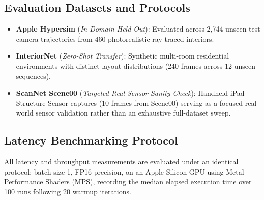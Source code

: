\documentclass[10pt,twocolumn,letterpaper]{article}
\begin{document}
\subsection{Evaluation Datasets and Protocols}
\begin{itemize}
    \item \textbf{Apple Hypersim} \cite{roberts2021hypersim} (\textit{In-Domain Held-Out}): Evaluated across 2,744 unseen test camera trajectories from 460 photorealistic ray-traced interiors.
    \item \textbf{InteriorNet} \cite{li2018interiornet} (\textit{Zero-Shot Transfer}): Synthetic multi-room residential environments with distinct layout distributions (240 frames across 12 unseen sequences).
    \item \textbf{ScanNet Scene00} \cite{dai2017scannet} (\textit{Targeted Real Sensor Sanity Check}): Handheld iPad Structure Sensor captures (10 frames from Scene00) serving as a focused real-world sensor validation rather than an exhaustive full-dataset sweep.
\end{itemize}

\subsection{Latency Benchmarking Protocol}
All latency and throughput measurements are evaluated under an identical protocol: batch size 1, FP16 precision, on an Apple Silicon GPU using Metal Performance Shaders (MPS), recording the median elapsed execution time over 100 runs following 20 warmup iterations.
\end{document}
